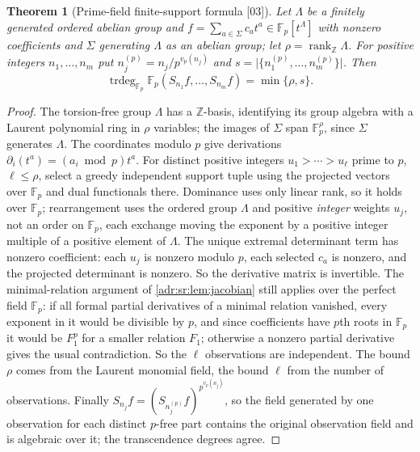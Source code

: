 \documentclass[11pt,letterpaper]{article}
\numberwithin{equation}{section}
\newtheorem{theorem}{Theorem}[section]
\theoremstyle{definition}
\theoremstyle{remark}
\newcommand{\Z}{\mathbb Z}
\newcommand{\trdeg}{\operatorname{trdeg}}
\newcommand{\abs}[1]{\lvert#1\rvert}
\newcommand{\src}[1]{\textup{[#1]}}%
\begin{document}
\begin{theorem}[Prime-field finite-support formula \src{03}]
\label{adr:sr:thm:prime}
Let $\Lambda$ be a finitely generated ordered abelian group and
$f=\sum_{a\in\Sigma}c_at^a\in\mathbb F_p[t^\Lambda]$ with nonzero coefficients
and $\Sigma$ generating $\Lambda$ as an abelian group; let
$\rho=\operatorname{rank}_\Z\Lambda$. For positive integers
$n_1,\ldots,n_m$ put $n_j^{(p)}=n_j/p^{v_p(n_j)}$ and
$s=\abs{\{n_1^{(p)},\ldots,n_m^{(p)}\}}$. Then
\begin{equation}\label{adr:sr:eq:prime}
 \trdeg_{\mathbb F_p}\mathbb F_p(S_{n_1}f,\ldots,S_{n_m}f)=\min\{\rho,s\}.
\end{equation}
\end{theorem}
\begin{proof}
The torsion-free group $\Lambda$ has a $\Z$-basis, identifying its group
algebra with a Laurent polynomial ring in $\rho$ variables; the images of
$\Sigma$ span $\mathbb F_p^\rho$, since $\Sigma$ generates $\Lambda$. The
coordinates modulo $p$ give derivations $\partial_i(t^a)=(a_i\bmod p)t^a$. For
distinct positive integers $u_1>\cdots>u_\ell$ prime to $p$, $\ell\le\rho$,
select a greedy independent support tuple using the projected vectors over
$\mathbb F_p$ and dual functionals there. Dominance uses only linear rank, so
it holds over $\mathbb F_p$; rearrangement uses the ordered group $\Lambda$ and
positive \emph{integer} weights $u_j$, not an order on $\mathbb F_p$, each
exchange moving the exponent by a positive integer multiple of a positive
element of $\Lambda$. The unique extremal determinant term has nonzero
coefficient: each $u_j$ is nonzero modulo $p$, each selected $c_a$ is nonzero,
and the projected determinant is nonzero. So the derivative matrix is
invertible. The minimal-relation argument of \cref{adr:sr:lem:jacobian} still
applies over the perfect field $\mathbb F_p$: if all formal partial
derivatives of a minimal relation vanished, every exponent in it would be
divisible by $p$, and since coefficients have $p$th roots in $\mathbb F_p$ it
would be $F_1^p$ for a smaller relation $F_1$; otherwise a nonzero partial
derivative gives the usual contradiction. So the $\ell$ observations are
independent. The bound $\rho$ comes from the Laurent monomial field, the bound
$\ell$ from the number of observations. Finally
$S_{n_j}f=(S_{n_j^{(p)}}f)^{p^{v_p(n_j)}}$, so the field generated by one
observation for each distinct $p$-free part contains the original observation
field and is algebraic over it; the transcendence degrees agree.
\end{proof}
\end{document}
